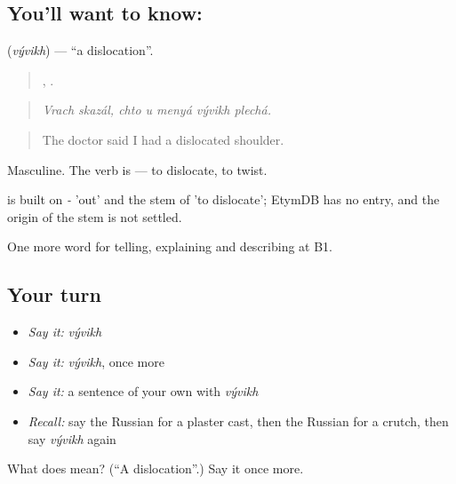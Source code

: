 \subsection*{You'll want to know: }
\textbf{} (\emph{vývikh}) — \textquotedblleft{}a dislocation\textquotedblright{}.

\begin{quote}
 ,     .
\end{quote}

\begin{quote}
\emph{Vrach skazál, chto u menyá vývikh plechá.}
\end{quote}

\begin{quote}
The doctor said I had a dislocated shoulder.
\end{quote}

Masculine. The verb is \emph{} — to dislocate, to twist.

\begin{cousinweb}
\emph{} is built on \emph{-} 'out' and the stem of \emph{} 'to dislocate'; EtymDB has no entry, and the origin of the stem is not settled.
\end{cousinweb}

\begin{grammarlens}[title={What you've built}]
One more word for telling, explaining and describing at B1.
\end{grammarlens}

\subsection*{Your turn}
\begin{itemize}
\raggedright
  \item \emph{Say it:} \emph{vývikh}
  \item \emph{Say it:} \emph{vývikh}, once more
  \item \emph{Say it:} a sentence of your own with \emph{vývikh}
  \item \emph{Recall:} say the Russian for a plaster cast, then the Russian for a crutch, then say \emph{vývikh} again
\end{itemize}

\begin{tcolorbox}[breakable,colback=teal!4,colframe=teal!35!black,title={Before you move on}]
What does  mean? (\textquotedblleft{}A dislocation\textquotedblright{}.) Say it once more.
\end{tcolorbox}
